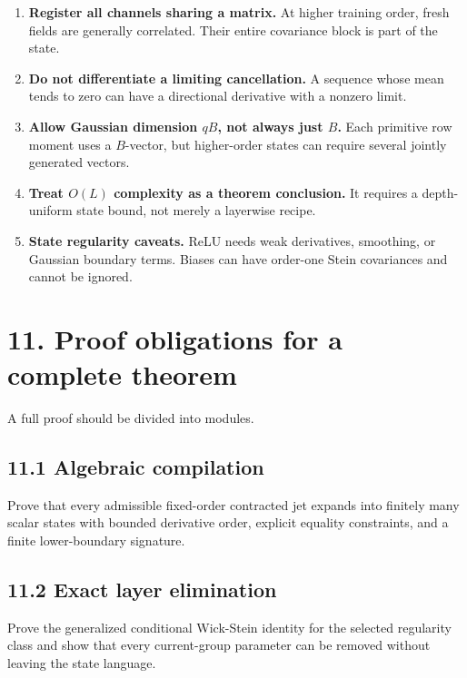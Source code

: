 \begin{enumerate}
\item \textbf{Register all channels sharing a matrix.} At higher training order,
    fresh fields are generally correlated. Their entire covariance block is
    part of the state.
\item \textbf{Do not differentiate a limiting cancellation.} A sequence whose mean
    tends to zero can have a directional derivative with a nonzero limit.
\item \textbf{Allow Gaussian dimension \(qB\), not always just \(B\).} Each primitive
    row moment uses a \(B\)-vector, but higher-order states can require several
    jointly generated vectors.
\item \textbf{Treat \(O(L)\) complexity as a theorem conclusion.} It requires a
    depth-uniform state bound, not merely a layerwise recipe.
\item \textbf{State regularity caveats.} ReLU needs weak derivatives, smoothing, or
    Gaussian boundary terms. Biases can have order-one Stein covariances and
    cannot be ignored.
\end{enumerate}


\section*{11. Proof obligations for a complete theorem}


A full proof should be divided into modules.

\subsection*{11.1 Algebraic compilation}


Prove that every admissible fixed-order contracted jet expands into finitely
many scalar states with bounded derivative order, explicit equality
constraints, and a finite lower-boundary signature.

\subsection*{11.2 Exact layer elimination}


Prove the generalized conditional Wick-Stein identity for the selected
regularity class and show that every current-group parameter can be removed
without leaving the state language.

